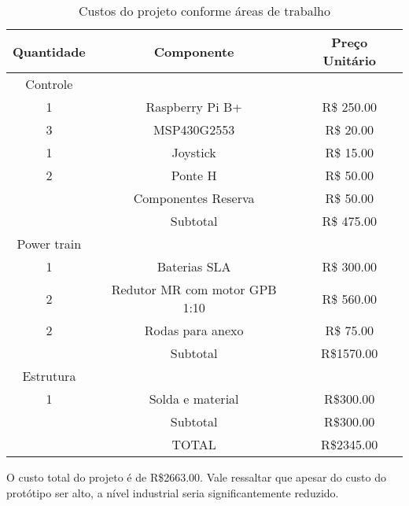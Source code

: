 \begin{table}[!ht]
\centering
\begin{tabular}{ |c|c|c| }
 \hline
Quantidade & Componente & Preço Unitário\\
 \hline
Controle &  & \\
 1 & Raspberry Pi B+   &  R\$ 250.00 \\
 3 & MSP430G2553  & R\$ 20.00 \\
 1 & Joystick  & R\$ 15.00 \\
 2 & Ponte H &  R\$ 50.00 \\
  & Componentes Reserva & R\$ 50.00\\
& Subtotal & R\$ 475.00\\ \hline

Power train &  & \\
1 & Baterias SLA  & R\$ 300.00\\
2 & Redutor MR com motor GPB 1:10 &  R\$ 560.00\\
2 & Rodas para anexo & R\$ 75.00\\
& Subtotal &  R\$1570.00\\ \hline

Estrutura &  & \\
1 &  Solda e material & R\$300.00\\
 & Subtotal & R\$300.00 \\ \hline

& TOTAL &  R\$2345.00\\ \hline
\end{tabular}
\caption{Custos do projeto conforme áreas de trabalho}
\label{tab:custos_tabela}
\end{table}

O custo total do projeto é de R\$2663.00.  Vale ressaltar que apesar do custo do protótipo ser alto, a nível industrial seria significantemente reduzido.
